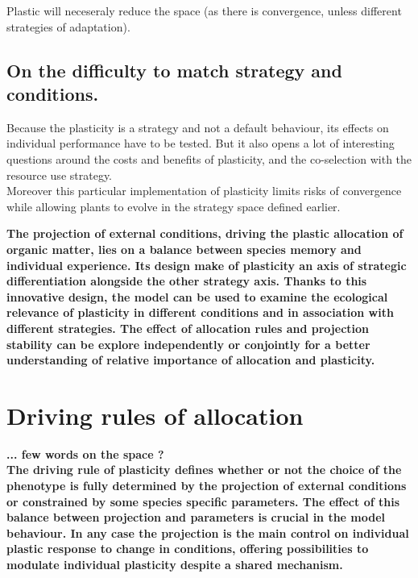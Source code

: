 Plastic will neceseraly reduce the space (as there is convergence, unless different strategies of adaptation).


\subsection{On the difficulty to match strategy and conditions.}

 Because the plasticity is a strategy and not a default behaviour, its effects on individual performance have to be tested. But it also opens a lot of interesting questions around the costs and benefits of plasticity, and the co-selection with the resource use strategy.\\

 Moreover this particular implementation of plasticity limits risks of convergence while allowing plants to evolve in the strategy space defined earlier.
 
 
\textbf{The projection of external conditions, driving the plastic allocation of organic matter, lies on a balance between species memory and individual experience. Its design make of plasticity an axis of strategic differentiation alongside the other strategy axis. Thanks to this innovative design, the model can be used to examine the ecological relevance of plasticity in different conditions and in association with different strategies. The effect of allocation rules and projection stability can be explore independently or conjointly for a better understanding of relative importance of allocation and plasticity.}


\section{Driving rules of allocation}

\textbf{... few words on the space ?\\
The driving rule of plasticity defines whether or not the choice of the  phenotype is fully determined by the projection of external conditions or constrained by some species specific parameters. The effect of this balance between projection and parameters is crucial in the model behaviour. In any case the projection is the main control on individual plastic response to change in conditions, offering possibilities to modulate individual plasticity despite a shared mechanism.}




